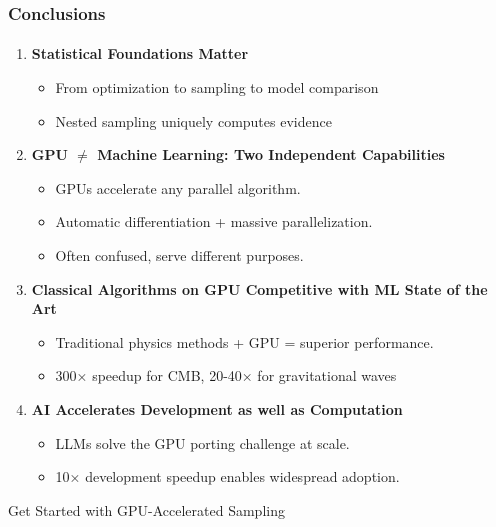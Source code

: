 \documentclass[aspectratio=169]{beamer}
\begin{document}
\begin{frame}
    \frametitle{Conclusions}
    \framesubtitle{}
        \begin{enumerate}
            \item \textbf{Statistical Foundations Matter}
                \begin{itemize}
                    \item From optimization to sampling to model comparison
                    \item Nested sampling uniquely computes evidence
                \end{itemize}
            \item \textbf{GPU $\neq$ Machine Learning: Two Independent Capabilities}
                \begin{itemize}
                    \item GPUs accelerate any parallel algorithm.
                    \item Automatic differentiation + massive parallelization.
                    \item Often confused, serve different purposes.
                \end{itemize}
            \item \textbf{Classical Algorithms on GPU Competitive with ML State of the Art}
                \begin{itemize}
                    \item Traditional physics methods + GPU = superior performance.
                    \item 300× speedup for CMB, 20-40× for gravitational waves
                \end{itemize}
            \item \textbf{AI Accelerates Development as well as Computation}
                \begin{itemize}
                    \item LLMs solve the GPU porting challenge at scale.
                    \item 10× development speedup enables widespread adoption.
                \end{itemize}
        \end{enumerate}
        \vfill
        \begin{alertblock}{Get Started with GPU-Accelerated Sampling}
            \centering
            \Large

\end{alertblock}
\end{frame}
\end{document}
